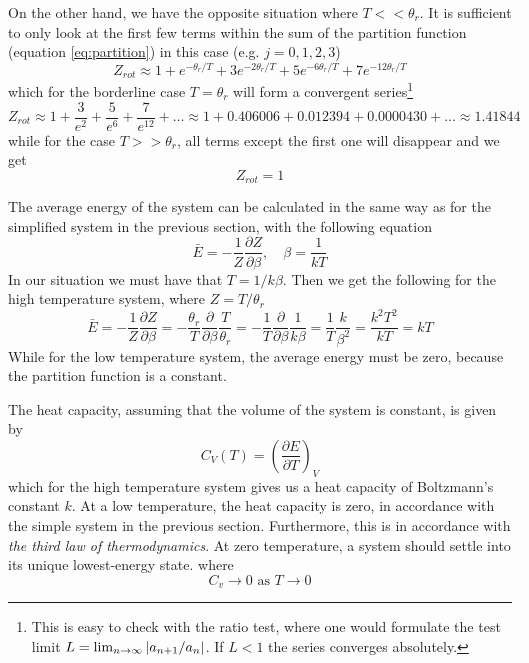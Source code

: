 \documentclass[10pt,a4paper]{amsart}
\begin{document}
On the other hand, we have the opposite situation where $T << \theta_r$. It is sufficient to only look at the first few terms within the sum of the partition function (equation \ref{eq:partition}) in this case (e.g. $j=0,1,2,3$)
\begin{equation}
Z_{rot} \approx 1+e^{-\theta_r/T}+3e^{-2\theta_r/T}+5e^{-6\theta_r/T}+7e^{-12\theta_r/T}
\end{equation}
which for the borderline case $T=\theta_r$ will form a convergent series\footnote{This is easy to check with the ratio test, where one would formulate the test limit $L=\lim_{n\to\infty}\abs{a_{n+1}/a_n}$. If $L<1$ the series converges absolutely.}
\begin{equation*}
Z_{rot} \approx 1 + \frac{3}{e^2}+\frac{5}{e^6}+\frac{7}{e^{12}} + \dots \approx 1 + 0.406006 + 0.012394 + 0.0000430 + \dots \approx 1.41844
\end{equation*}
while for the case $T >> \theta_r$, all terms except the first one will disappear and we get
\begin{equation*}
Z_{rot} = 1
\end{equation*}

The average energy of the system can be calculated in the same way as for the simplified system in the previous section, with the following equation
\begin{equation}
\bar{E}=-\frac{1}{Z}\frac{\partial Z}{\partial\beta}, \quad \beta=\frac{1}{kT}
\end{equation}
In our situation we must have that $T = 1/k\beta$. Then we get the following for the high temperature system, where $Z = T/\theta_r$
\begin{equation*}
\label{eq:anale}
\bar{E}=-\frac{1}{Z}\frac{\partial Z}{\partial \beta } = 
-\frac{\theta_r}{T}\frac{\partial}{\partial\beta}\frac{T}{\theta_r} = 
-\frac{1}{T}\frac{\partial}{\partial\beta}\frac{1}{k\beta}=\frac{1}{T}\frac{k}{\beta^2}=\frac{k^2T^2}{kT}=kT
\end{equation*}
While for the low temperature system, the average energy must be zero, because the partition function is a constant.

The heat capacity, assuming that the volume of the system is constant, is given by
\begin{equation}
C_V(T) = \left(\frac{\partial E}{\partial T}\right)_V
\end{equation}
which for the high temperature system gives us a heat capacity of Boltzmann's constant $k$. At a low temperature, the heat capacity is zero, in accordance with the simple system in the previous section. Furthermore, this is in accordance with \emph{the third law of thermodynamics}. At zero temperature, a system should settle into its unique lowest-energy state. where
\begin{equation}
\label{eq:thirdlaw}
C_v \to 0 \text{ as } T \to 0
\end{equation}
\end{document}
